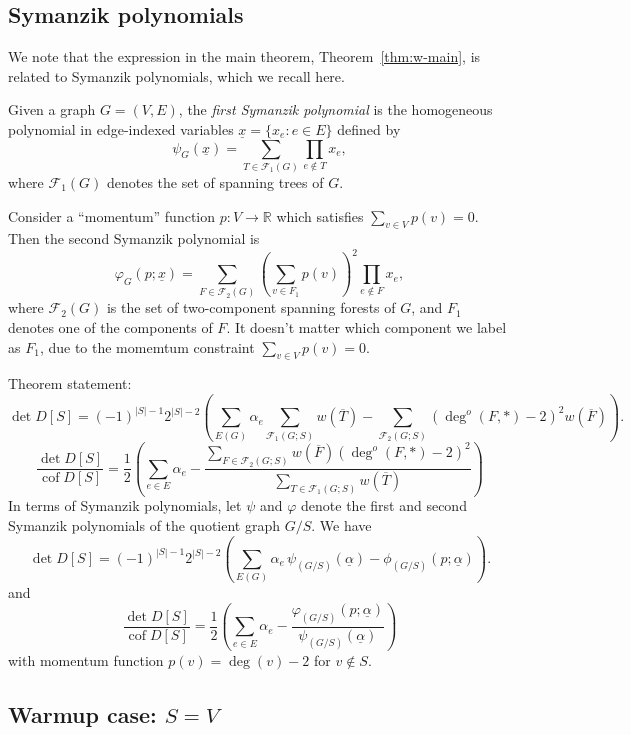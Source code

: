\documentclass{amsart}
\theoremstyle{definition}
\newcommand{\RR}{\mathbb{R}}
\DeclareMathOperator{\cof}{cof}
\newcommand{\trees}{\mathcal{F}_1}
\newcommand{\forests}{\mathcal{F}}
\newcommand{\degout}{\deg^o}
\begin{document}
\subsection{Symanzik polynomials}

We note that the expression in the main theorem, Theorem~\ref{thm:w-main}, is related to Symanzik polynomials, which we recall here.

Given a graph $G = (V, E)$, the {\em first Symanzik polynomial} is the homogeneous polynomial in edge-indexed variables $\underline{x} = \{x_e : e \in E\}$ defined by
\[
	\psi_G(\underline{x}) = \sum_{T \in \trees(G)} \prod_{e \not \in T} x_e ,
\]
where $\trees(G)$ denotes the set of spanning trees of $G$.

Consider a ``momentum'' function $p: V \to \RR$ which satisfies $\sum_{v \in V} p(v) = 0$.
Then the second Symanzik polynomial is
\[
	\varphi_G(p; \underline{x}) = \sum_{F \in \forests_2(G)} \left(\sum_{v \in F_1} p(v) \right)^2 \prod_{e \not\in F} x_e ,
\]
where $\forests_2(G)$ is the set of two-component spanning forests of $G$, and $F_1$ denotes one of the components of $F$.
It doesn't matter which component we label as $F_1$, due to the momemtum constraint $\sum_{v \in V} p(v) = 0$.

Theorem statement:
\[
	\det D[S] = (-1)^{|S|-1} 2^{|S|-2} \left( \sum_{E(G)}\alpha_e \sum_{\trees(G;S)} w(\overline{T}) - \sum_{\forests_2(G;S)} (\degout(F,*) - 2)^2 w(\overline{F}) \right).
\]
\[
	\frac{\det D[S]}{\cof D[S]} = \frac12 \left( \sum_{e \in E} \alpha_e - \frac{\sum_{F \in \forests_2(G; S)} w(\overline{F}) (\degout(F,*) - 2)^2}{\sum_{T \in \trees(G; S)} w(\overline{T})} \right)
\]
In terms of Symanzik polynomials, let $\psi$ and $\varphi$ denote the first and second Symanzik polynomials of the quotient graph $G/S$.
We have
\[
	\det D[S] = (-1)^{|S|-1} 2^{|S|-2} \left( \sum_{E(G)}\alpha_e \, \psi_{(G/S)}(\underline{\alpha}) - \phi_{(G/S)}(p; \underline{\alpha}) \right).
\]
and
\[
	\frac{\det D[S]}{\cof D[S]} = \frac12 \left( \sum_{e \in E} \alpha_e - \frac{\varphi_{(G/S)}(p; \underline{\alpha})}{\psi_{(G/S)}(\underline{\alpha})} \right)
\]
with momentum function $p(v) = \deg(v) - 2$ for $v \not \in S$.

\subsection{Warmup case: $S = V$}
\end{document}
